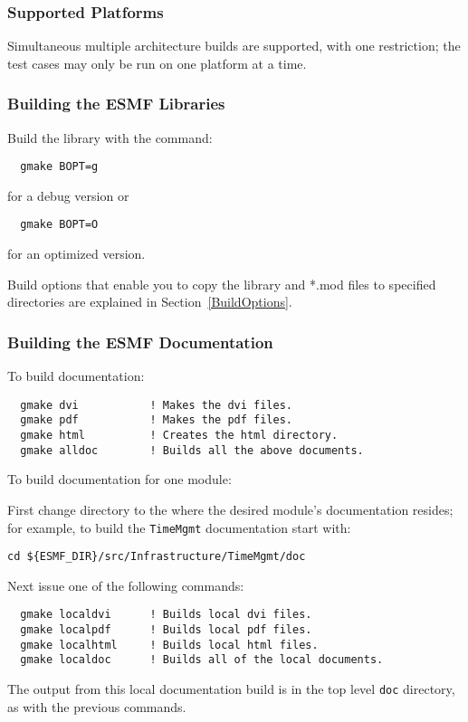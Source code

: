 \subsubsection{Supported Platforms}


Simultaneous multiple architecture builds are supported, with
one restriction; the test cases may only be run on one platform at a time. 

\subsubsection{Building the ESMF Libraries}
\label{BuildESMF}

Build the library with the command:
\begin{verbatim}
  gmake BOPT=g  
\end{verbatim}
  for a debug version or
\begin{verbatim}
  gmake BOPT=O  
\end{verbatim}
  for an optimized version.



Build options that enable you to copy the library and *.mod files to
specified directories are explained in Section~\ref{BuildOptions}. 

\subsubsection{Building the ESMF Documentation}
\label{BuildDocumentation}

\noindent To build documentation:
\begin{verbatim}
  gmake dvi           ! Makes the dvi files.
  gmake pdf           ! Makes the pdf files.
  gmake html          ! Creates the html directory.
  gmake alldoc        ! Builds all the above documents.
\end{verbatim}

\noindent To build documentation for one module:

\noindent First change directory to the where the desired module's documentation resides;  for
example, to build the {\tt TimeMgmt} documentation start with:

\begin{verbatim}
cd ${ESMF_DIR}/src/Infrastructure/TimeMgmt/doc
\end{verbatim}

\noindent Next issue one of the following commands:
\begin{verbatim}
  gmake localdvi      ! Builds local dvi files.
  gmake localpdf      ! Builds local pdf files.
  gmake localhtml     ! Builds local html files.
  gmake localdoc      ! Builds all of the local documents.
\end{verbatim}

\noindent The output from this local documentation build is in the top level {\tt doc}
directory, as with the previous commands.







